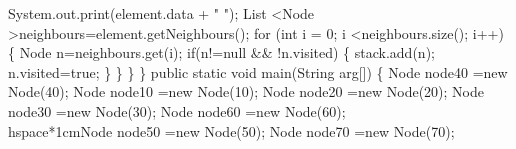 \documentclass{report}
\begin{document}
			\hspace*{1cm}System.out.print(element.data + " ");\newline
 			\hspace*{1cm}List \textless Node \textgreater neighbours=element.getNeighbours();\newline
			\hspace*{1cm}for (int i = 0; i \textless neighbours.size(); i++) \{\newline
				\hspace*{1.5cm}Node n=neighbours.get(i);\newline
				\hspace*{1.5cm}if(n!=null \&\& !n.visited)\newline
				\hspace*{1.5cm}\{\newline
					\hspace*{2cm}stack.add(n);\newline
					\hspace*{2cm}n.visited=true;\newline
 				\hspace*{1.5cm}\}\newline
			\hspace*{1cm}\}\newline
		\hspace*{0.8cm}\}\newline
	\}\newline
 	\hspace*{0.8cm}public static void main(String arg[])\newline
	\hspace*{0.8cm}\{ \newline
		\hspace*{1cm}Node node40 =new Node(40);\newline
		\hspace*{1cm}Node node10 =new Node(10);\newline
		\hspace*{1cm}Node node20 =new Node(20);\newline
		\hspace*{1cm}Node node30 =new Node(30);\newline
		\hspace*{1cm}Node node60 =new Node(60);\newline
		\\hspace*{1cm}Node node50 =new Node(50);\newline
		\hspace*{1cm}Node node70 =new Node(70);\newline
\end{document}
